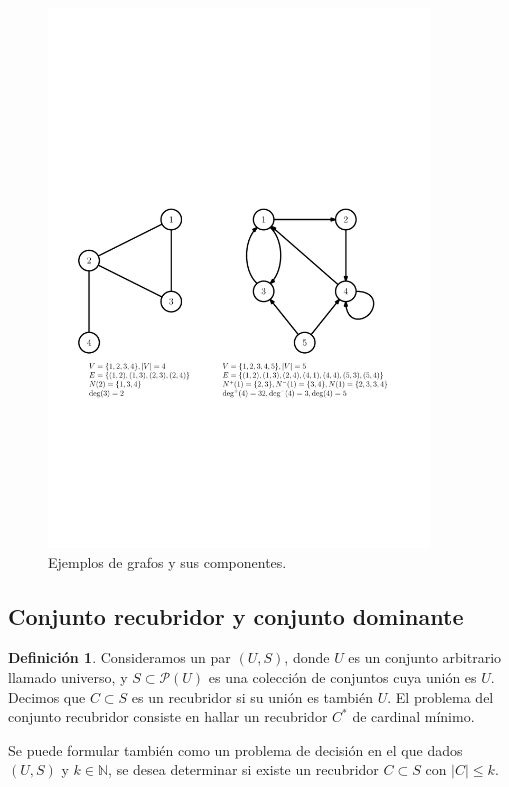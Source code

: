 \documentclass[a4paper,12pt]{report}
\theoremstyle{definition}
\newtheorem{dfn}{Definición}
\begin{document}
\begin{figure}[H]
  \centering
  \includegraphics[width=0.9\textwidth]{imgs_cutres/grafos}
  \caption{Ejemplos de grafos y sus componentes.}
  \label{fig:grafo}
\end{figure}

\subsection{Conjunto recubridor y conjunto dominante}

\begin{dfn}
  Consideramos un par $(U, S)$, donde $U$ es un conjunto arbitrario llamado universo, y $S \subset \mathcal{P}(U)$ es una colección de conjuntos cuya unión es $U$. Decimos que $C \subset S$ es un recubridor si su unión es también $U$. El problema del conjunto recubridor consiste en hallar un recubridor $C^*$ de cardinal mínimo.

  Se puede formular también como un problema de decisión en el que dados $(U,S)$ y $k \in \mathbb{N}$, se desea determinar si existe un recubridor $C \subset S$ con $\lvert C \rvert \leq k$.
\end{dfn}
\end{document}
